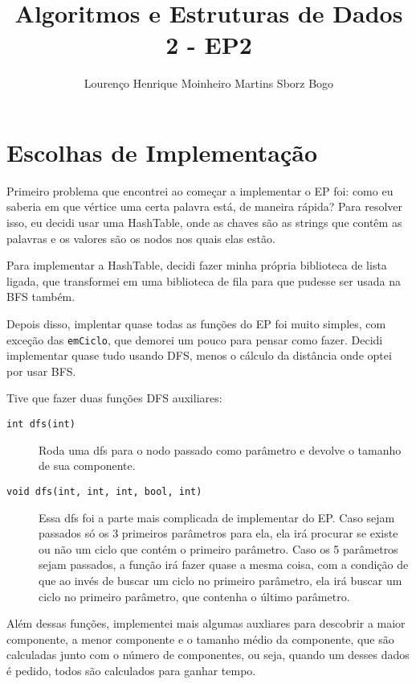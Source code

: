 \documentclass[12pt]{article}
\title{Algoritmos e Estruturas de Dados 2 - EP2}
\author{Lourenço Henrique Moinheiro Martins Sborz Bogo}
\date{}
\begin{document}
\maketitle

\section{Escolhas de Implementação}

Primeiro problema que encontrei ao começar a implementar o EP foi: como eu saberia em que vértice uma certa palavra está, de maneira rápida? Para resolver isso, eu decidi usar uma HashTable, onde as chaves são as strings que contêm as palavras e os valores são os nodos nos quais elas estão.

Para implementar a HashTable, decidi fazer minha própria biblioteca de lista ligada, que transformei em uma biblioteca de fila para que pudesse ser usada na BFS também.

Depois disso, implentar quase todas as funções do EP foi muito simples, com exceção das \texttt{emCiclo}, que demorei um pouco para pensar como fazer. Decidi implementar quase tudo usando DFS, menos o cálculo da distância onde optei por usar BFS.

Tive que fazer duas funções DFS auxiliares:

\begin{description}
\item[\texttt{int dfs(int)}] Roda uma dfs para o nodo passado como parâmetro e devolve o tamanho de sua componente.
  
\item[\texttt{void dfs(int, int, int, bool, int)}] Essa dfs foi a parte mais complicada de implementar do EP. Caso sejam passados só os 3 primeiros parâmetros para ela, ela irá procurar se existe ou não um ciclo que contém o primeiro parâmetro. Caso os 5 parâmetros sejam passados, a função irá fazer quase a mesma coisa, com a condição de que ao invés de buscar um ciclo no primeiro parâmetro, ela irá buscar um ciclo no primeiro parâmetro, que contenha o último parâmetro.
  
\end{description}

Além dessas funções, implementei mais algumas auxliares para descobrir a maior componente, a menor componente e o tamanho médio da componente, que são calculadas junto com o número de componentes, ou seja, quando um desses dados é pedido, todos são calculados para ganhar tempo.
\end{document}
